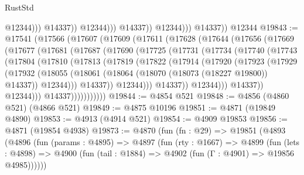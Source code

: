 \begin{lexlean}{RustStd}
\begin{coremodule}
{\begin{coremodule}
{{{{{{{{{{{{{{{{{{{{{{{{{{{{{                                  @12344)))
                            @14337))
                        @12344)))
                  @14337))
              @12344)))
        @14337))
    @12344
@19843 := @17541
    (@17566
      (@17607
        (@17609
          (@17611
            (@17628
              (@17644
                (@17656
                  (@17669
                    (@17677
                      (@17681
                        (@17687
                          (@17690
                            (@17725
                              (@17731
                                (@17734
                                  (@17740
                                    (@17743
                                      (@17804
                                        (@17810
                                          (@17813
                                            (@17819
                                              (@17822
                                                (@17914
                                                  (@17920
                                                    (@17923
                                                      (@17929
                                                        (@17932
                                                          (@18055
                                                            (@18061
                                                              (@18064
                                                                (@18070
                                                                  (@18073 (@18227 @19800))
                                                                  @14337))
                                                              @12344)))
                                                        @14337))
                                                    @12344)))
                                              @14337))
                                          @12344)))
                                    @14337))
                                @12344)))
                          @14337)))))))))))
@19844 := @4854 @521
@19848 := @4856 (@4860 @521) (@4866 @521)
@19849 := @4875 @10196
@19851 := @4871 (@19849 @4890)
@19853 := @4913 (@4914 @521)
@19854 := @4909 @19853
@19856 := @4871 (@19854 @4938)
@19873 := @4870
    (fun (fn : @29) =>
    @19851
      (@4893
        (@4896
          (fun (params : @4895) =>
          @4897
            (fun (rty : @1667) =>
            @4899
              (fun (lets : @4898) =>
              @4900 (fun (tail : @1884) => @4902 (fun (Γ : @4901) => @19856 @4985))))))
}}}}}}}}}}}}}}}}}}}}}}}}}}}}}
\end{coremodule}}
\end{coremodule}
\end{lexlean}

